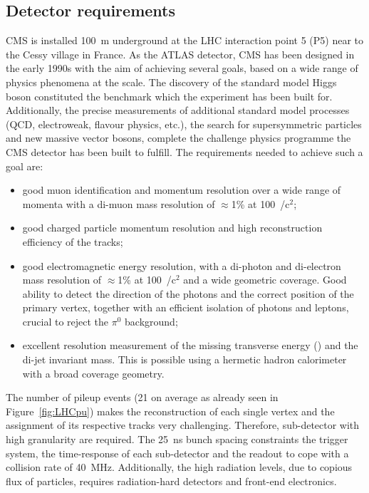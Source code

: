 \subsection{Detector requirements}
\label{subsec:CMSconcept}

CMS is installed 100~\si{m} underground at the LHC interaction point 5 (P5)
near to the Cessy village in France. As the ATLAS detector, CMS has been designed in the early 1990s 
with the aim of achieving several goals, based on a wide range of physics phenomena at the \tev scale.
The discovery of the standard model Higgs boson constituted the benchmark which the experiment 
has been built for. Additionally, the precise measurements
of additional standard model processes (QCD, electroweak, flavour physics, etc.), 
the search for supersymmetric particles and new massive vector bosons, complete
the challenge physics programme the CMS detector has been built to fulfill.
The requirements needed to achieve such a goal are:

\begin{itemize}
\item good muon identification and momentum resolution over a wide range of 
momenta with a di-muon mass resolution of $\approx$1\% at 100~\gev/\si{c}$^2$;
\item good charged particle momentum resolution and high reconstruction efficiency 
of the tracks; 
\item good electromagnetic energy resolution, with a di-photon and di-electron mass resolution 
of $\approx$1\% at 100~\gev/\si{c}$^2$ and a wide geometric coverage.
Good ability to detect the direction of the photons and the
correct position of the primary vertex, together with an efficient 
isolation of photons and leptons, crucial to reject the $\pi^{0}$ background;
\item excellent resolution measurement of the missing transverse energy (\met) 
and the di-jet invariant mass. This is possible using a hermetic hadron calorimeter 
with a broad coverage geometry.
\end{itemize}

The number of pileup events (21 on average as already seen in Figure~\ref{fig:LHCpu}) 
makes the reconstruction of each single vertex and the assignment of its respective 
tracks very challenging. Therefore, sub-detector with high granularity are required. 
The 25~\si{\ns} bunch spacing constraints the trigger system, the time-response of each sub-detector 
and the readout to cope with a collision rate of 40~\si{\mega\hertz}. Additionally, the high
radiation levels, due to copious flux of particles, requires radiation-hard detectors and front-end electronics.

